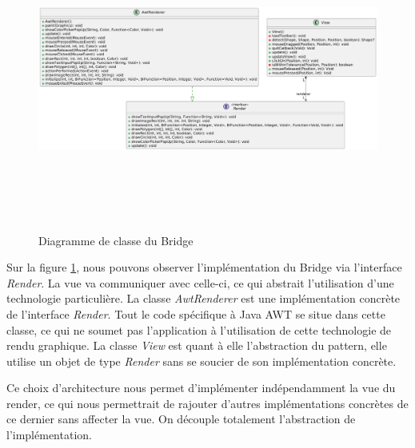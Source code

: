 \documentclass{article}
\begin{document}
\begin{figure}[h]
    \centering
    \includegraphics[width=\textwidth,height=10.0cm,keepaspectratio]{bridge.png}
    \caption{Diagramme de classe du Bridge}
    \label{Bridge}
\end{figure}
\FloatBarrier

Sur la figure \ref{Bridge}, nous pouvons observer l'implémentation du Bridge via l'interface \textit{Render}.
La vue va communiquer avec celle-ci, ce qui abstrait l'utilisation d'une technologie particulière.
La classe \textit{AwtRenderer} est une implémentation concrète de l'interface \textit{Render}. 
Tout le code spécifique à Java AWT se situe dans cette classe, ce qui ne soumet pas l'application à
l'utilisation de cette technologie de rendu graphique.
La classe \textit{View} est quant à elle l'abstraction du pattern, elle utilise un objet de type \textit{Render} sans se soucier de son implémentation concrète.

Ce choix d'architecture nous permet d'implémenter indépendamment la vue du render, ce qui nous permettrait de rajouter d'autres
implémentations concrètes de ce dernier sans affecter la vue.
On découple totalement l'abstraction de l'implémentation.
\FloatBarrier
\end{document}
